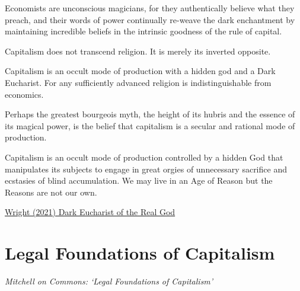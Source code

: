 \documentclass[
]{book}
\begin{document}
Economists are unconscious magicians, for they authentically believe what they preach, and their words of power continually re-weave the dark enchantment by maintaining incredible beliefs in the intrinsic goodness of the rule of capital.

Capitalism does not transcend religion. It is merely its inverted opposite.

Capitalism is an occult mode of production with a hidden god and a Dark Eucharist. For any sufficiently advanced religion is indistinguishable from economics.

Perhaps the greatest bourgeois myth, the height of its hubris and the essence of its magical power, is the belief that capitalism is a secular and rational mode of production.

Capitalism is an occult mode of production controlled by a hidden God that manipulates its subjects to engage in great orgies of unnecessary sacrifice and ecstasies of blind accumulation. We may live in an Age of Reason but the Reasons are not our own.

\href{https://ianwrightsite.wordpress.com/2021/11/25/dark-eucharist-of-the-real-god/}{Wright (2021) Dark Eucharist of the Real God}

\hypertarget{legal-foundations-of-capitalism}{%
\chapter{Legal Foundations of Capitalism}\label{legal-foundations-of-capitalism}}

\emph{Mitchell on Commons: `Legal Foundations of Capitalism'}
\end{document}
